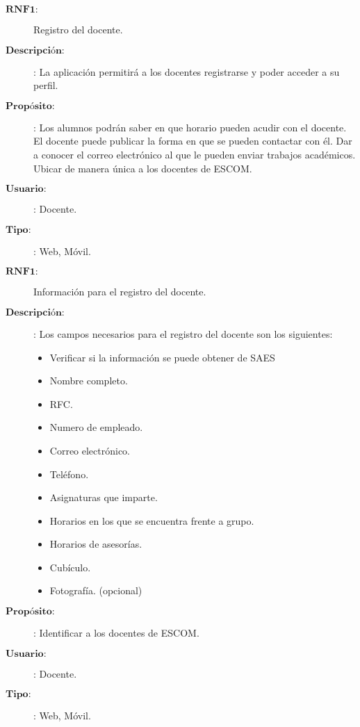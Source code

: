 \begin{description}
\item[$\textbf{RNF1:}$] Registro del docente.
\item[$\textbf{Descripción:}$]:  La aplicación permitirá a los docentes registrarse y poder acceder a su perfil.
\item[$\textbf{Propósito:}$]:
Los alumnos podrán saber en que horario pueden acudir con el docente.
El docente puede publicar la forma en que se pueden contactar con él.
Dar a conocer el correo electrónico al que le pueden enviar trabajos académicos.
Ubicar de manera única a los docentes de ESCOM.
\item[$\textbf{Usuario:}$]: Docente.
\item[$\textbf{Tipo:}$]: Web, Móvil. \\

\item[$\textbf{RNF1:}$] Información para el registro del docente.
\item[$\textbf{Descripción:}$]: Los campos necesarios para el registro del docente son los siguientes: \\
	\begin{itemize}
		\item Verificar si la información se puede obtener de SAES
		\item Nombre completo.
		\item RFC.
		\item Numero de empleado.
		\item Correo electrónico.
		\item Teléfono.
		\item Asignaturas que imparte.
		\item Horarios en los que se encuentra frente a grupo.
		\item Horarios de asesorías.
		\item Cubículo.
		\item Fotografía. (opcional)
	\end{itemize}
\item[$\textbf{Propósito:}$]: Identificar a los docentes de ESCOM.
\item[$\textbf{Usuario:}$]: Docente.
\item[$\textbf{Tipo:}$]: Web, Móvil. \\


\end{description}
